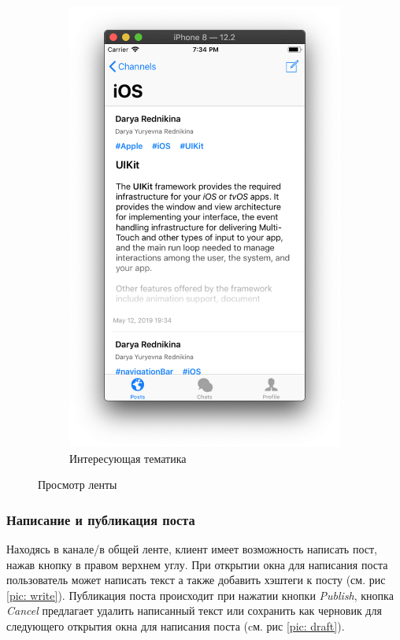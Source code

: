\documentclass[a4paper,12pt]{article}
\begin{document}
\begin{figure}[h!]
\begin{subfigure}[b]{0.3\linewidth}
			\includegraphics[width=\linewidth]{../includes/pmi/ios_channel.png}
			\caption{\label{sub: ios}Интересующая тематика}
		\end{subfigure}
		\caption{\label{pic: n}Просмотр ленты}
	\end{figure}
	\clearpage
	\subsubsection{Написание и публикация поста}
	Находясь в канале/в общей ленте, клиент имеет возможность написать пост, нажав кнопку в правом верхнем углу. При открытии окна для написания поста пользователь может написать текст а также добавить хэштеги к посту (см. рис \ref{pic: write}). Публикация поста происходит при нажатии кнопки \textit{Publish}, кнопка \textit{Cancel} предлагает удалить написанный текст или сохранить как черновик для следующего открытия окна для написания поста (cм. рис \ref{pic: draft}).
	
\end{document}
